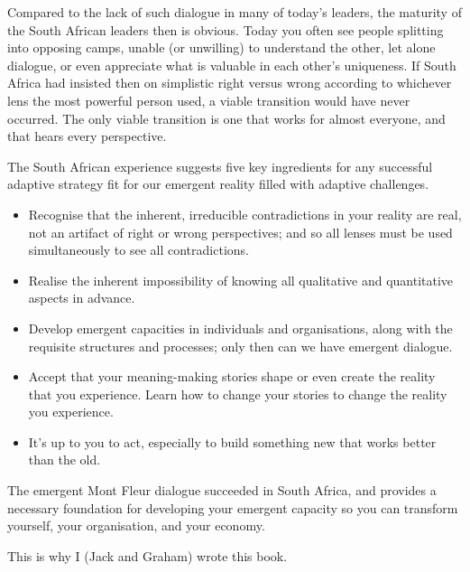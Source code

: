 Compared to the lack of such dialogue in many of today’s leaders, the maturity of the South African leaders then is obvious. Today you often see people splitting into opposing camps, unable (or unwilling) to understand the other, let alone dialogue, or even appreciate what is valuable in each other's uniqueness. If South Africa had insisted then on simplistic right versus wrong according to whichever lens the most powerful person used, a viable transition would have never occurred. The only viable transition is one that works for almost everyone, and that hears every perspective.


The South African experience suggests five key ingredients for any successful adaptive strategy fit for our emergent reality filled with adaptive challenges.


\begin{itemize}
\item Recognise that the inherent, irreducible contradictions in your reality are real, not an artifact of right or wrong perspectives; and so all lenses must be used simultaneously to see all contradictions.
\item Realise the inherent impossibility of knowing all qualitative and quantitative aspects in advance.
\item Develop emergent capacities in individuals and organisations, along with the requisite structures and processes; only then can we have emergent dialogue.
\item Accept that your meaning\hyp{}making stories shape or even create the reality that you experience. Learn how to change your stories to change the reality you experience.
\item It's up to you to act, especially to build something new that works better than the old.
\end{itemize}


The emergent Mont Fleur dialogue succeeded in South Africa, and provides a necessary foundation for developing your emergent capacity so you can transform yourself, your organisation, and your economy. 


This is why I (Jack and Graham) wrote this book.